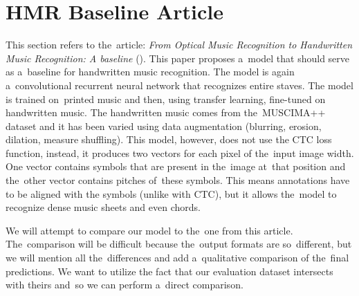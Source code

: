 \section{HMR Baseline Article}

This section refers to the~article: \emph{From Optical Music Recognition to Handwritten Music Recognition: A baseline} (\cite{HmrBaseline}). This paper proposes a~model that should serve as a~baseline for handwritten music recognition. The model is again a~convolutional recurrent neural network that recognizes entire staves. The model is trained on~printed music and then, using transfer learning, fine-tuned on handwritten music. The handwritten music comes from the~MUSCIMA++ dataset and it has been varied using data augmentation (blurring, erosion, dilation, measure shuffling). This model, however, does not use the CTC loss function, instead, it produces two vectors for each pixel of the~input image width. One vector contains symbols that are present in the~image at~that position and the~other vector contains pitches of~these symbols. This means annotations have to be aligned with the symbols (unlike with CTC), but it allows the~model to recognize dense music sheets and even chords.

We will attempt to compare our model to the~one from this article. The~comparison will be difficult because the~output formats are so~different, but we will mention all the~differences and add a~qualitative comparison of the~final predictions. We want to utilize the fact that our evaluation dataset intersects with theirs and~so we can perform a~direct comparison.
